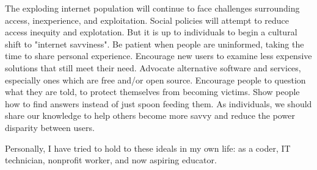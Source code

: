 
The exploding internet population will continue to face challenges
surrounding access, inexperience, and exploitation. Social policies
will attempt to reduce access inequity and explotation. But it is up
to individuals to begin a cultural shift to "internet savviness". Be
patient when people are uninformed, taking the time to share personal
experience. Encourage new users to examine less expensive solutions
that still meet their need. Advocate alternative software and services,
especially ones which are free and/or open source. Encourage people
to question what they are told, to protect themselves from becoming
victims. Show people how to find answers instead of just spoon feeding
them. As individuals, we should share our knowledge to help others
become more savvy and reduce the power disparity between users.

Personally, I have tried to hold to these ideals in my own life: as a
coder, IT technician, nonprofit worker, and now aspiring educator.
